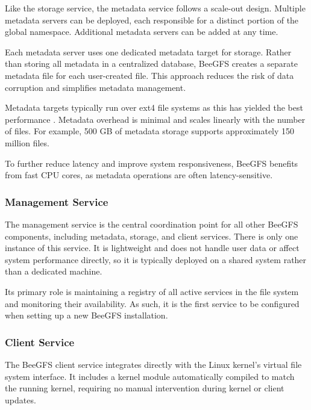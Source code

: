 Like the storage service, the metadata service follows a scale-out design. Multiple metadata servers can be deployed, each responsible for a distinct portion of the global namespace. Additional metadata servers can be added at any time.

Each metadata server uses one dedicated metadata target for storage. Rather than storing all metadata in a centralized database, BeeGFS creates a separate metadata file for each user-created file. This approach reduces the risk of data corruption and simplifies metadata management.

Metadata targets typically run over ext4 file systems as this has yielded the best performance \cite{ext4}. Metadata overhead is minimal and scales linearly with the number of files. For example, 500 GB of metadata storage supports approximately 150 million files.

To further reduce latency and improve system responsiveness, BeeGFS benefits from fast CPU cores, as metadata operations are often latency-sensitive.

\subsubsection{Management Service}

\vspace{-1.2em}

The management service is the central coordination point for all other BeeGFS components, including metadata, storage, and client services. There is only one instance of this service. It is lightweight and does not handle user data or affect system performance directly, so it is typically deployed on a shared system rather than a dedicated machine.

Its primary role is maintaining a registry of all active services in the file system and monitoring their availability. As such, it is the first service to be configured when setting up a new BeeGFS installation.

\subsubsection{Client Service}

\vspace{-1.2em}

The BeeGFS client service integrates directly with the Linux kernel’s virtual file system interface. It includes a kernel module automatically compiled to match the running kernel, requiring no manual intervention during kernel or client updates.

